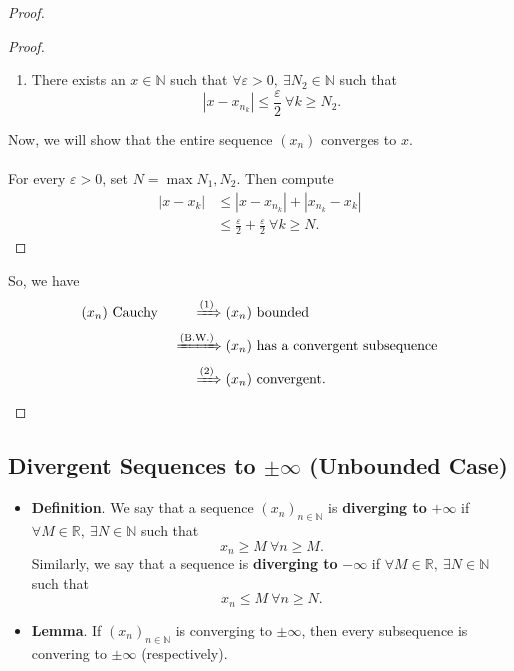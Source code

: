 \documentclass{article}
\newcommand{\R}{\mathbb{R}}
\newcommand{\N}{\mathbb{N}}
\newcommand{\seq}[2]{(#1_{#2})_{#2 \in \N}}
\newcommand{\?}{\stackrel{?}{=}}
\begin{document}
\begin{itemize}
\begin{proof}
\begin{enumerate}[label=(\arabic*)]
\begin{proof}
\begin{enumerate}[label=(\roman*)]
                    \item There exists an $x \in \N$ such that $\forall \varepsilon > 0, \ \exists N_2 \in \N$ such that
                    $$|x - x_{n_k}| \leq \frac{\varepsilon}{2} \ \forall k \geq N_2.$$
                \end{enumerate}
                Now, we will show that the entire sequence $(x_n)$ converges to $x$. \\\\
                For every $\varepsilon > 0$, set $N = \max{N_1, N_2}$. Then compute
                \begin{align*}
                    |x - x_k| &\leq |x - x_{n_k}| + |x_{n_k} - x_k| \\
                    &\leq \frac{\varepsilon}{2} + \frac{\varepsilon}{2} \ \forall k \geq N.
                \end{align*}
            \end{proof}
        \end{enumerate}
        So, we have
        \begin{alignat*}{2}
            (x_n) \text{ Cauchy } &&\xRightarrow{\text{(1)}} (x_n) &\text{ bounded } \\
            &&\xRightarrow{\text{(B.W.)}} (x_n) &\text{ has a convergent subsequence} \\
            &&\xRightarrow{\text{(2)}} (x_n) &\text{ convergent}.
        \end{alignat*}
    \end{proof}
\end{itemize}

\subsection{Divergent Sequences to $\pm \infty$ (Unbounded Case)}

\begin{itemize}
    \item \textbf{Definition}. We say that a sequence $\seq{x}{n}$ is \textbf{diverging to} $+\infty$ if $\forall M \in \R, \ \exists N \in \N$ such that
    $$x_n \geq M \ \forall n \geq M.$$
    Similarly, we say that a sequence is \textbf{diverging to} $-\infty$ if $\forall M \in \R, \ \exists N \in \N$ such that
    $$x_n \leq M \ \forall n \geq N.$$
    \item \textbf{Lemma}. If $\seq{x}{n}$ is converging to $\pm \infty$, then every subsequence is convering to $\pm \infty$ (respectively).
\end{itemize}
 
\end{document}
